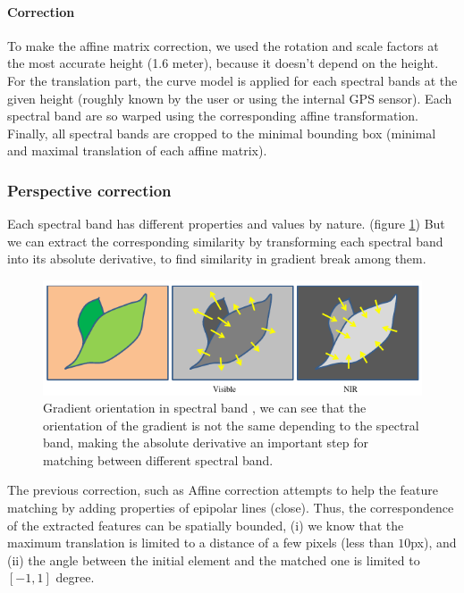\documentclass[]{elsarticle}
\begin{document}
	\paragraph{Correction}
	
	To make the affine matrix correction, we used the rotation and scale factors at the most accurate height (1.6 meter), because it doesn't depend on the height.
	For the translation part, the curve model is applied for each spectral bands at the given height (roughly known by the user or using the internal GPS sensor).
	Each spectral band are so warped using the corresponding affine transformation.
	Finally, all spectral bands are cropped to the minimal bounding box (minimal and maximal translation of each affine matrix).
	
	\subsubsection{Perspective correction}
	
	
	Each spectral band has different properties and values by nature. (figure \ref{fig:vegetable-gradient})
	But we can extract the corresponding similarity by transforming each spectral band into its absolute derivative,
	to find similarity in gradient break among them.
	
	\begin{figure}[H]
		\centering
		\includegraphics[width=0.6\linewidth]{../figures/contrast-inversion.png}
		\caption{
			Gradient orientation in spectral band \cite{rabatel:hal-01684135},
			we can see that the orientation of the gradient is not the same depending to the spectral band,
			making the absolute derivative an important step for matching between different spectral band.
		}
		\label{fig:vegetable-gradient}
	\end{figure}
	
	\par The previous correction, such as Affine correction attempts to help the feature matching by adding properties of epipolar lines (close).
	Thus, the correspondence of the extracted features can be spatially bounded,
	(i) we know that the maximum translation is limited to a distance of a few pixels (less than $10$px),
	and (ii) the angle between the initial element and the matched one is limited to $[-1,1]$ degree.
	
\end{document}
